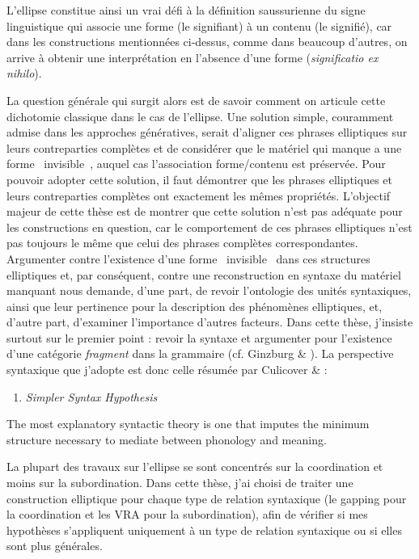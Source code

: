 L'ellipse constitue ainsi un vrai défi à la définition saussurienne du signe linguistique qui associe une forme (le signifiant) à un contenu (le signifié), car dans les constructions mentionnées ci-dessus, comme dans beaucoup d'autres, on arrive à obtenir une interprétation en l'absence d'une forme (\textit{significatio ex nihilo}). 

La question générale qui surgit alors est de savoir comment on articule cette dichotomie classique dans le cas de l'ellipse. Une solution simple, couramment admise dans les approches génératives, serait d'aligner ces phrases elliptiques sur leurs contreparties complètes et de considérer que le matériel qui manque a une forme {\guillemotleft}~invisible~{\guillemotright}, auquel cas l'association forme/contenu est préservée. Pour pouvoir adopter cette solution, il faut démontrer que les phrases elliptiques et leurs contreparties complètes ont exactement les mêmes propriétés. L'objectif majeur de cette thèse est de montrer que cette solution n'est pas adéquate pour les constructions en question, car le comportement de ces phrases elliptiques n'est pas toujours le même que celui des phrases complètes correspondantes. Argumenter contre l'existence d'une forme {\guillemotleft}~invisible~{\guillemotright} dans ces structures elliptiques et, par conséquent, contre une reconstruction en syntaxe du matériel manquant nous demande, d'une part, de revoir l'ontologie des unités syntaxiques, ainsi que leur pertinence pour la description des phénomènes elliptiques, et, d'autre part, d'examiner l'importance d'autres facteurs. Dans cette thèse, j'insiste surtout sur le premier point : revoir la syntaxe et argumenter pour l'existence d'une catégorie \textit{fragment} dans la grammaire (cf. Ginzburg \& \citet{Sag2000}). La perspective syntaxique que j'adopte est donc celle résumée par Culicover \& \citet[5]{Jackendoff2005} :


\begin{enumerate}
\item   \textit{Simpler Syntax Hypothesis~}


\end{enumerate}
The most explanatory syntactic theory is one that imputes the minimum structure necessary to mediate between phonology and meaning.

La plupart des travaux sur l'ellipse se sont concentrés sur la coordination et moins sur la subordination. Dans cette thèse, j'ai choisi de traiter une construction elliptique pour chaque type de relation syntaxique (le gapping pour la coordination et les VRA pour la subordination), afin de vérifier si mes hypothèses s'appliquent uniquement à un type de relation syntaxique ou si elles sont plus générales. 

